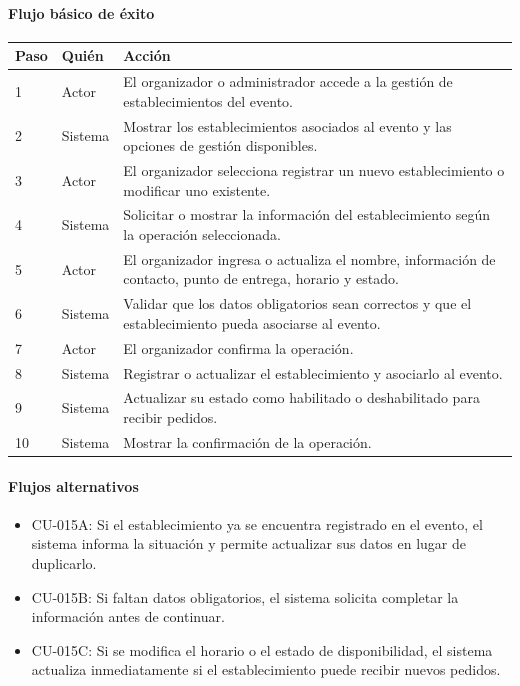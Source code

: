 \paragraph{Flujo básico de éxito}
\begin{longtable}{P{1.1cm}P{1.8cm}P{10.5cm}}
\toprule
\textbf{Paso} & \textbf{Quién} & \textbf{Acción}\\
\midrule
{} & Actor & El organizador o administrador accede a la gestión de establecimientos del evento.\\
2 & Sistema & Mostrar los establecimientos asociados al evento y las opciones de gestión disponibles.\\
3 & Actor & El organizador selecciona registrar un nuevo establecimiento o modificar uno existente.\\
4 & Sistema & Solicitar o mostrar la información del establecimiento según la operación seleccionada.\\
5 & Actor & El organizador ingresa o actualiza el nombre, información de contacto, punto de entrega, horario y estado.\\
6 & Sistema & Validar que los datos obligatorios sean correctos y que el establecimiento pueda asociarse al evento.\\
7 & Actor & El organizador confirma la operación.\\
8 & Sistema & Registrar o actualizar el establecimiento y asociarlo al evento.\\
9 & Sistema & Actualizar su estado como habilitado o deshabilitado para recibir pedidos.\\
10 & Sistema & Mostrar la confirmación de la operación.\\
\bottomrule
\end{longtable}

\paragraph{Flujos alternativos}
\begin{itemize}[leftmargin=1.4em, topsep=1pt]
  \item CU-015A: Si el establecimiento ya se encuentra registrado en el evento, el sistema informa la situación y permite actualizar sus datos en lugar de duplicarlo.
  \item CU-015B: Si faltan datos obligatorios, el sistema solicita completar la información antes de continuar.
  \item CU-015C: Si se modifica el horario o el estado de disponibilidad, el sistema actualiza inmediatamente si el establecimiento puede recibir nuevos pedidos.
\end{itemize}

